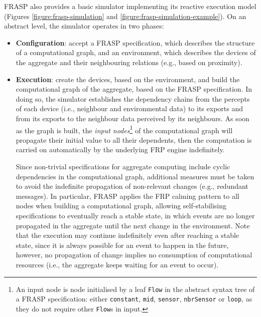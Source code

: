 FRASP also provides a basic simulator implementing its reactive execution model
(Figures \ref{figure:frasp-simulation} and
\ref{figure:frasp-simulation-example}). On an abstract level, the simulator
operates in two phases:
\begin{itemize}
  \item \textbf{Configuration}: accept a FRASP specification, which describes
        the structure of a computational graph, and an environment, which
        describes the devices of the aggregate and their neighbouring relations
        (e.g., based on proximity).
  \item \textbf{Execution}: create the devices, based on the environment, and
        build the computational graph of the aggregate, based on the FRASP
        specification. In doing so, the simulator establishes the dependency
        chains from the percepts of each device (i.e., neighbour and
        environmental data) to its exports and from its exports to the
        neighbour data perceived by its neighbours. As soon as the graph is
        built, the \textit{input nodes}\footnote{
          An input node is node initialised by a leaf \texttt{Flow} in the
          abstract syntax tree of a FRASP specification: either
          \texttt{constant}, \texttt{mid}, \texttt{sensor}, \texttt{nbrSensor}
          or \texttt{loop}, as they do not require other \texttt{Flow}s in
          input.
        } of the computational graph will propagate their initial value to all
        their dependents, then the computation is carried on automatically by
        the underlying \ac{FRP} engine indefinitely.

        Since non-trivial specifications for aggregate computing include cyclic
        dependencies in the computational graph, additional measures must be
        taken to avoid the indefinite propagation of non-relevant changes
        (e.g., redundant messages). In particular, FRASP applies the FRP
        calming pattern to all nodes when building a computational graph,
        allowing self-stabilising specifications to eventually reach a stable
        state, in which events are no longer propagated in the aggregate until
        the next change in the environment. Note that the execution may
        continue indefinitely even after reaching a stable state, since it is
        always possible for an event to happen in the future, however, no
        propagation of change implies no consumption of computational resources
        (i.e., the aggregate keeps waiting for an event to occur).
\end{itemize}

